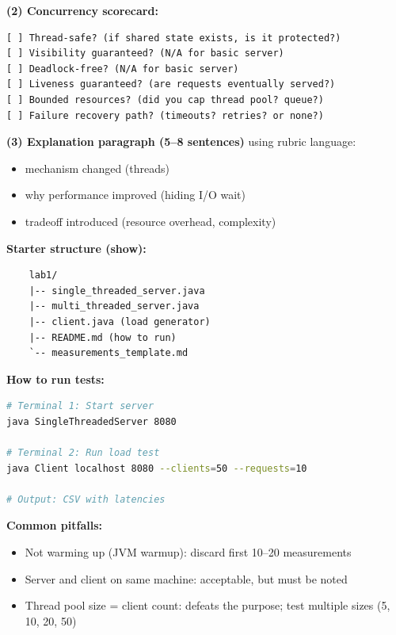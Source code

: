 \documentclass[11pt,a4paper]{article}
\begin{document}
\begin{center}
\end{center}


\textbf{(2) Concurrency scorecard:}
\begin{verbatim}
[ ] Thread-safe? (if shared state exists, is it protected?)
[ ] Visibility guaranteed? (N/A for basic server)
[ ] Deadlock-free? (N/A for basic server)
[ ] Liveness guaranteed? (are requests eventually served?)
[ ] Bounded resources? (did you cap thread pool? queue?)
[ ] Failure recovery path? (timeouts? retries? or none?)
\end{verbatim}

\textbf{(3) Explanation paragraph (5--8 sentences)} using rubric language:
\begin{itemize}[leftmargin=*]
\item mechanism changed (threads)
\item why performance improved (hiding I/O wait)
\item tradeoff introduced (resource overhead, complexity)
\end{itemize}

\textbf{Starter structure (show):}
\begin{verbatim}
	lab1/
	|-- single_threaded_server.java
	|-- multi_threaded_server.java
	|-- client.java (load generator)
	|-- README.md (how to run)
	`-- measurements_template.md
\end{verbatim}


\textbf{How to run tests:}
\begin{lstlisting}[language=bash]
# Terminal 1: Start server
java SingleThreadedServer 8080

# Terminal 2: Run load test
java Client localhost 8080 --clients=50 --requests=10

# Output: CSV with latencies
\end{lstlisting}

\textbf{Common pitfalls:}
\begin{itemize}[leftmargin=*]
\item Not warming up (JVM warmup): discard first 10--20 measurements
\item Server and client on same machine: acceptable, but must be noted
\item Thread pool size = client count: defeats the purpose; test multiple sizes (5, 10, 20, 50)
\end{itemize}
\end{document}
